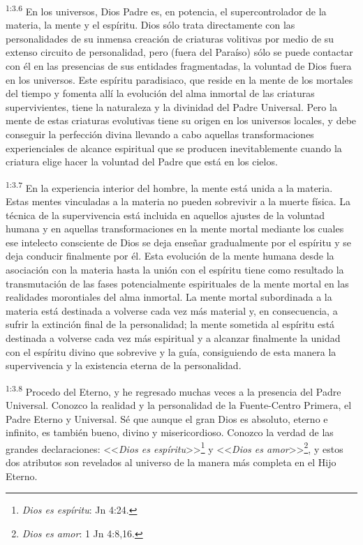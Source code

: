 \par
\textsuperscript{1:3.6} En los universos, Dios Padre es, en potencia, el supercontrolador de la materia, la mente y el espíritu. Dios sólo trata directamente con las personalidades de su inmensa creación de criaturas volitivas por medio de su extenso circuito de personalidad, pero (fuera del Paraíso) sólo se puede contactar con él en las presencias de sus entidades fragmentadas, la voluntad de Dios fuera en los universos. Este espíritu paradisiaco, que reside en la mente de los mortales del tiempo y fomenta allí la evolución del alma inmortal de las criaturas supervivientes, tiene la naturaleza y la divinidad del Padre Universal. Pero la mente de estas criaturas evolutivas tiene su origen en los universos locales, y debe conseguir la perfección divina llevando a cabo aquellas transformaciones experienciales de alcance espiritual que se producen inevitablemente cuando la criatura elige hacer la voluntad del Padre que está en los cielos.

\par
\textsuperscript{1:3.7} En la experiencia interior del hombre, la mente está unida a la materia. Estas mentes vinculadas a la materia no pueden sobrevivir a la muerte física. La técnica de la supervivencia está incluida en aquellos ajustes de la voluntad humana y en aquellas transformaciones en la mente mortal mediante los cuales ese intelecto consciente de Dios se deja enseñar gradualmente por el espíritu y se deja conducir finalmente por él. Esta evolución de la mente humana desde la asociación con la materia hasta la unión con el espíritu tiene como resultado la transmutación de las fases potencialmente espirituales de la mente mortal en las realidades morontiales del alma inmortal. La mente mortal subordinada a la materia está destinada a volverse cada vez más material y, en consecuencia, a sufrir la extinción final de la personalidad; la mente sometida al espíritu está destinada a volverse cada vez más espiritual y a alcanzar finalmente la unidad con el espíritu divino que sobrevive y la guía, consiguiendo de esta manera la supervivencia y la existencia eterna de la personalidad.

\par
\textsuperscript{1:3.8} Procedo del Eterno, y he regresado muchas veces a la presencia del Padre Universal. Conozco la realidad y la personalidad de la Fuente-Centro Primera, el Padre Eterno y Universal. Sé que aunque el gran Dios es absoluto, eterno e infinito, es también bueno, divino y misericordioso. Conozco la verdad de las grandes declaraciones: <<\textit{Dios es espíritu}>>\footnote{\textit{Dios es espíritu}: Jn 4:24.} y <<\textit{Dios es amor}>>\footnote{\textit{Dios es amor}: 1 Jn 4:8,16.}, y estos dos atributos son revelados al universo de la manera más completa en el Hijo Eterno.

